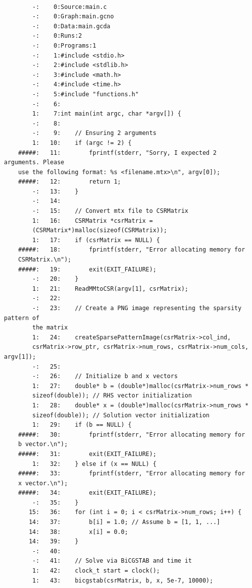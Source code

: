 \documentclass[12pt]{article}
\begin{document}
 	\begin{mdframed}[style=myboxstyleTerminal1]
		\begin{verbatim}
  
        -:    0:Source:main.c
        -:    0:Graph:main.gcno
        -:    0:Data:main.gcda
        -:    0:Runs:2
        -:    0:Programs:1
        -:    1:#include <stdio.h>
        -:    2:#include <stdlib.h>
        -:    3:#include <math.h>
        -:    4:#include <time.h>
        -:    5:#include "functions.h"
        -:    6:
        1:    7:int main(int argc, char *argv[]) {
        -:    8:
        -:    9:    // Ensuring 2 arguments
        1:   10:    if (argc != 2) {
    #####:   11:        fprintf(stderr, "Sorry, I expected 2 arguments. Please 
    use the following format: %s <filename.mtx>\n", argv[0]);
    #####:   12:        return 1;
        -:   13:    }
        -:   14:
        -:   15:    // Convert mtx file to CSRMatrix
        1:   16:    CSRMatrix *csrMatrix = 
        (CSRMatrix*)malloc(sizeof(CSRMatrix));
        1:   17:    if (csrMatrix == NULL) {
    #####:   18:        fprintf(stderr, "Error allocating memory for 
    CSRMatrix.\n");
    #####:   19:        exit(EXIT_FAILURE);
        -:   20:    }
        1:   21:    ReadMMtoCSR(argv[1], csrMatrix);
        -:   22:
        -:   23:    // Create a PNG image representing the sparsity pattern of 
        the matrix
        1:   24:    createSparsePatternImage(csrMatrix->col_ind, 
        csrMatrix->row_ptr, csrMatrix->num_rows, csrMatrix->num_cols, argv[1]);
        -:   25:
        -:   26:    // Initialize b and x vectors
        1:   27:    double* b = (double*)malloc(csrMatrix->num_rows * 
        sizeof(double)); // RHS vector initialization
        1:   28:    double* x = (double*)malloc(csrMatrix->num_rows * 
        sizeof(double)); // Solution vector initialization
        1:   29:    if (b == NULL) {
    #####:   30:        fprintf(stderr, "Error allocating memory for 
    b vector.\n");
    #####:   31:        exit(EXIT_FAILURE);
        1:   32:    } else if (x == NULL) {
    #####:   33:        fprintf(stderr, "Error allocating memory for 
    x vector.\n");
    #####:   34:        exit(EXIT_FAILURE);
        -:   35:    }
       15:   36:    for (int i = 0; i < csrMatrix->num_rows; i++) {
       14:   37:        b[i] = 1.0; // Assume b = [1, 1, ...]
       14:   38:        x[i] = 0.0;
       14:   39:    }
        -:   40:
        -:   41:    // Solve via BiCGSTAB and time it
        1:   42:    clock_t start = clock();
        1:   43:    bicgstab(csrMatrix, b, x, 5e-7, 10000);

\end{verbatim}
\end{mdframed}
\end{document}
